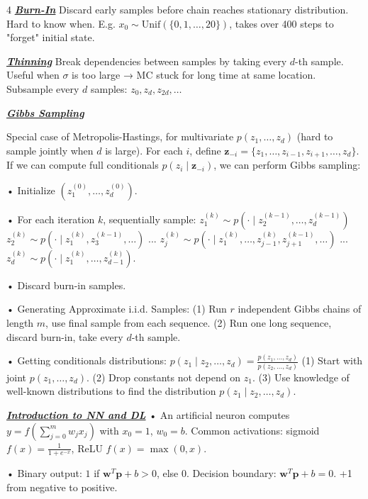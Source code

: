 \documentclass[10pt]{article}
\newcommand{\bulletPoint}[1]{\ul{\textit{\textbf{#1}}}}
\begin{document}
\begin{multicols*}{4}
\bulletPoint{Burn-In} \quad
Discard early samples before chain reaches stationary distribution. 
Hard to know when. E.g. $x_0 \sim \text{Unif}(\{0,1,\dots,20\})$, takes over 400 steps to "forget" initial state.

\bulletPoint{Thinning}\quad
Break dependencies between samples by taking every $d$-th sample. 
Useful when $\sigma$ is too large → MC stuck for long time at same location. 
Subsample every $d$ samples: $z_0, z_d, z_{2d}, \dots$

\bulletPoint{Gibbs Sampling}\quad

Special case of Metropolis-Hastings, for multivariate $p(z_1, \dots, z_d)$ (hard to sample jointly when $d$ is large). 
For each $i$, define $\mathbf{z}_{-i} = \{z_1,\dots,z_{i-1},z_{i+1},\dots,z_d\}$. 
If we can compute full conditionals $p(z_i \mid \mathbf{z}_{-i})$, we can perform Gibbs sampling:

• Initialize $(z_1^{(0)}, \dots, z_d^{(0)})$.   

• For each iteration $k$, sequentially sample:
$z_1^{(k)} \sim p(\cdot \mid z_2^{(k-1)}, \dots, z_d^{(k-1)})$  
$z_2^{(k)} \sim p(\cdot \mid z_1^{(k)}, z_3^{(k-1)}, \dots)$  
...  
$z_j^{(k)} \sim p(\cdot \mid z_1^{(k)}, \dots, z_{j-1}^{(k)}, z_{j+1}^{(k-1)}, \dots)$  
...
$z_d^{(k)} \sim p(\cdot \mid z_1^{(k)}, \dots, z_{d-1}^{(k)})$. 

• Discard burn-in samples.

• Generating Approximate i.i.d. Samples: 
(1) Run $r$ independent Gibbs chains of length $m$, use final sample from each sequence.
(2) Run one long sequence, discard burn-in, take every $d$-th sample. 

• Getting conditionals distributions:
$p(z_1 \mid z_2, \dots, z_d) = \frac{p(z_1, \dots, z_d)}{p(z_2, \dots, z_d)}$
(1) Start with joint $p(z_1, \dots, z_d)$.   
(2) Drop constants not depend on $z_1$.   
(3) Use knowledge of well-known distributions to find the distribution $p(z_1 \mid z_2, \dots, z_d)$. 





\bulletPoint{Introduction to NN and DL} \quad
• An artificial neuron computes $y = f\left(\sum_{j=0}^{m} w_j x_j\right)$ with $x_0 = 1$, $w_0 = b$. \quad
Common activations: sigmoid $f(x) = \frac{1}{1 + e^{-x}}$, ReLU $f(x) = \max(0, x)$. 

• Binary output: $1$ if $\mathbf{w}^T \mathbf{p} + b > 0$, else $0$. \quad
Decision boundary: $\mathbf{w}^T \mathbf{p} + b = 0$. \quad +1 from negative to positive.


\end{multicols*}
\end{document}
